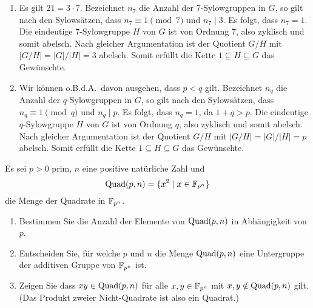 \begin{solution}
\begin{enumerate}[resume]
    \item
      Es gilt $21 = 3 \cdot 7$.
      Bezeichnet $n_7$ die Anzahl der $7$-Sylowgruppen in $G$, so gilt nach den Sylowsätzen, dass $n_7 \equiv 1 \pmod{7}$ und $n_7 \mid 3$.
      Es folgt, dass $n_7  = 1$.
      Die eindeutige $7$-Sylowgruppe $H$ von $G$ ist von Ordnung $7$, also zyklisch und somit abelsch.
      Nach gleicher Argumentation ist der Quotient $G/H$ mit $|G/H| = |G|/|H| = 3$ abelsch.
      Somit erfüllt die Kette $1 \subseteq H \subseteq G$ das Gewünschte.
      
    \item
      Wir können o.B.d.A.\ davon ausgehen, dass $p < q$ gilt.
      Bezeichnet $n_q$ die Anzahl der $q$-Sylowgruppen in $G$, so gilt nach den Sylowsätzen, dass $n_q \equiv 1 \pmod{q}$ und $n_q \mid p$.
      Es folgt, dass $n_q  = 1$, da $1 + q > p$.
      Die eindeutige $q$-Sylowgruppe $H$ von $G$ ist von Ordnung $q$, also zyklisch und somit abelsch.
      Nach gleicher Argumentation ist der Quotient $G/H$ mit $|G/H| = |G|/|H| = p$ abelsch.
      Somit erfüllt die Kette $1 \subseteq H \subseteq G$ das Gewünschte.
  \end{enumerate}
\end{solution}


\begin{question}[subtitle = Quadrate in endlichen Körpern]
  Es sei $p > 0$ prim, $n$ eine positive natürliche Zahl und
  \[
    \operatorname{Quad}(p,n) = \{x^2 \mid x \in \mathbb{F}_{p^n}\}
  \]
  die Menge der Quadrate in $\mathbb{F}_{p^n}$.
  \begin{enumerate}
    \item
      Bestimmen Sie die Anzahl der Elemente von $\operatorname{Quad}(p,n)$ in Abhängigkeit von $p$.
    \item
      Entscheiden Sie, für welche $p$ und $n$ die Menge $\operatorname{Quad}(p,n)$ eine Untergruppe der additiven Gruppe von $\mathbb{F}_{p^n}$ ist.
    \item
      Zeigen Sie dass $xy \in \operatorname{Quad}(p,n)$ für alle $x, y \in \mathbb{F}_{p^n}$ mit $x, y \notin \operatorname{Quad}(p,n)$ gilt.
      (Das Produkt zweier Nicht-Quadrate ist also ein Quadrat.)
  \end{enumerate}
\end{question}


